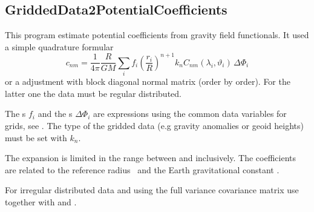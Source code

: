 \clearpage
\subsection{GriddedData2PotentialCoefficients}\label{GriddedData2PotentialCoefficients}
This program estimate potential coefficients from 
gravity field functionals. It used a simple quadrature formular
\begin{equation}
  c_{nm} = \frac{1}{4\pi}\frac{R}{GM} \sum_i f_i \left(\frac{r_i}{R}\right)^{n+1} k_n C_{nm}(\lambda_i,\vartheta_i)\,\Delta\Phi_i
\end{equation}
or a  adjustment with block diagonal normal matrix (order by order).
For the latter one the data must be regular distributed.

The s $f_i$ and the s $\Delta\Phi_i$ are expressions
using the common data variables for grids, see .
The type of the gridded data (e.g gravity anomalies or geoid heights)
must be set with  $k_n$.

The expansion is limited in the range between 
and  inclusively. The coefficients are related
to the reference radius~ and the Earth gravitational constant .

For irregular distributed data and using the full variance covariance matrix use
 together with 
and .


